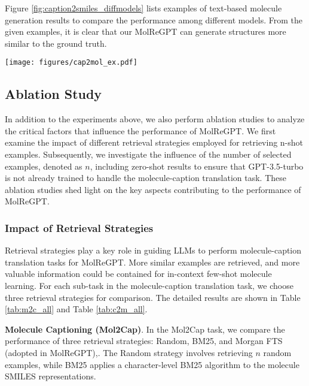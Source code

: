 \documentclass{article}
\theoremstyle{plain}
\theoremstyle{definition}
\theoremstyle{remark}
\begin{document}
Figure \ref{fig:caption2smiles_diffmodels} lists examples of text-based molecule generation results to compare the performance among different models. From the given examples, it is clear that our MolReGPT can generate structures more similar to the ground truth.
\begin{figure*}[htb]
   \centering
   \texttt{[image: figures/cap2mol\_ex.pdf]}
   \caption{Examples of molecules generated by different models, where SMILES strings are converted to molecule graphs for better visualization. Based on the same input caption, our MolReGPT can generate accurate molecule graphs described by the caption. In contrast, Transformer generates quite different molecules compared to the ground truth. Compared to Transformer, molecules generated by MolT5-base are closer to the ground truth but still miss so many details.}
   \label{fig:caption2smiles_diffmodels}
\end{figure*}

\subsection{Ablation Study}
In addition to the experiments above, we also perform ablation studies to analyze the critical factors that influence the performance of MolReGPT. We first examine the impact of different retrieval strategies employed for retrieving n-shot examples.
Subsequently, we investigate the influence of the number of selected examples, denoted as $n$, including zero-shot results to ensure that GPT-3.5-turbo is not already trained to handle the molecule-caption translation task. These ablation studies shed light on the key aspects contributing to the performance of MolReGPT.

\subsubsection{Impact of Retrieval Strategies}
Retrieval strategies play a key role in guiding LLMs to perform molecule-caption translation tasks for MolReGPT. 
More similar examples are retrieved, and more valuable information could be contained for in-context few-shot molecule learning.
For each sub-task in the molecule-caption translation task, we choose three retrieval strategies for comparison. The detailed results are shown in Table \ref{tab:m2c_all} and Table \ref{tab:c2m_all}. 

\textbf{Molecule Captioning (Mol2Cap)}. 
In the Mol2Cap task, we compare the performance of three retrieval strategies: Random, BM25, and Morgan FTS (adopted in MolReGPT),. 
The Random strategy involves retrieving \(n\) random examples, while BM25 applies a character-level BM25 algorithm to the molecule SMILES representations.
\end{document}
